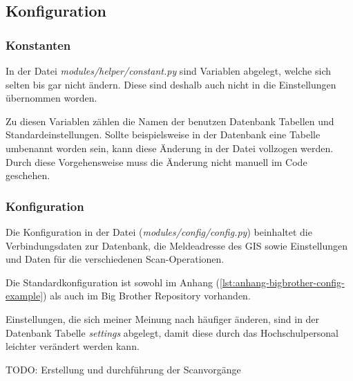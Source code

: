 \subsection{Konfiguration}

\subsubsection{Konstanten}

In der Datei \textit{modules/helper/constant.py} sind Variablen abgelegt, welche sich selten bis gar nicht ändern. Diese sind deshalb auch nicht in die Einstellungen übernommen worden.

Zu diesen Variablen zählen die Namen der benutzen Datenbank Tabellen und Standardeinstellungen.
Sollte beispielsweise in der Datenbank eine Tabelle umbenannt worden sein, kann diese Änderung in der Datei vollzogen werden. Durch diese Vorgehensweise muss die Änderung nicht manuell im Code geschehen.

\subsubsection{Konfiguration}

Die Konfiguration in der Datei (\textit{modules/config/config.py}) beinhaltet die Verbindungsdaten zur Datenbank, die Meldeadresse des GIS sowie Einstellungen und Daten für die verschiedenen Scan-Operationen.

Die Standardkonfiguration ist sowohl im Anhang (\ref{lst:anhang-bigbrother-config-example}) als auch im Big Brother Repository vorhanden.

Einstellungen, die sich meiner Meinung nach häufiger änderen, sind in der Datenbank Tabelle \textit{settings} abgelegt, damit diese durch das Hochschulpersonal leichter verändert werden kann.


TODO: Erstellung und durchführung der Scanvorgänge